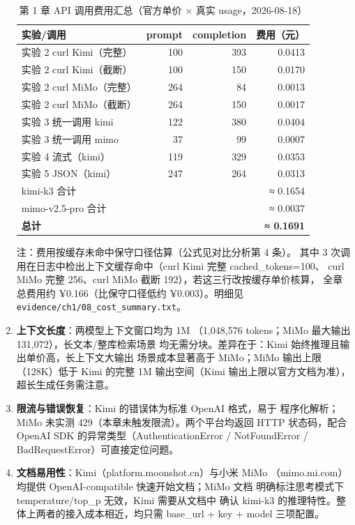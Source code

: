 \begin{enumerate}[leftmargin=4em,itemsep=0pt,topsep=2pt]
\begin{table}[H]
\centering
\caption{第 1 章 API 调用费用汇总（官方单价 × 真实 usage，2026-08-18）}
\label{tab:ch1_cost}
\small
\setlength{\tabcolsep}{4pt}
\begin{tabular}{lrrr}
\toprule
\textbf{实验/调用} & \textbf{prompt} & \textbf{completion} & \textbf{费用（元）} \\
\midrule
实验 2 curl Kimi（完整） & 100 & 393 & 0.0413 \\
实验 2 curl Kimi（截断） & 100 & 150 & 0.0170 \\
实验 2 curl MiMo（完整） & 264 & 84 & 0.0013 \\
实验 2 curl MiMo（截断） & 264 & 150 & 0.0017 \\
实验 3 统一调用 kimi & 122 & 380 & 0.0404 \\
实验 3 统一调用 mimo & 37 & 99 & 0.0007 \\
实验 4 流式（kimi） & 119 & 329 & 0.0353 \\
实验 5 JSON（kimi） & 247 & 264 & 0.0313 \\
\midrule
kimi-k3 合计 & & & ≈ 0.1654 \\
mimo-v2.5-pro 合计 & & & ≈ 0.0037 \\
\textbf{总计} & & & \textbf{≈ 0.1691} \\
\bottomrule
\end{tabular}

\par\vspace{3pt}
\begin{center}
{\footnotesize 注：费用按缓存未命中保守口径估算（公式见对比分析第 4 条）。
其中 3 次调用在日志中检出上下文缓存命中（curl Kimi 完整 cached\_tokens=100、
curl MiMo 完整 256、curl MiMo 截断 192），若这三行改按缓存单价核算，
全章总费用约 ¥0.166（比保守口径低约 ¥0.003）。明细见
\nolinkurl{evidence/ch1/08_cost_summary.txt}。}
\end{center}
\end{table}

    \item \textbf{上下文长度}：两模型上下文窗口均为 1M
          （1,048,576 tokens；MiMo 最大输出 131,072），长文本/整库检索场景
          均无需分块。差异在于：Kimi 始终推理且输出单价高，长上下文大输出
          场景成本显著高于 MiMo；MiMo 输出上限（128K）低于 Kimi 的完整
          1M 输出空间（Kimi 输出上限以官方文档为准），超长生成任务需注意。
    \item \textbf{限流与错误恢复}：Kimi 的错误体为标准 OpenAI 格式，易于
          程序化解析；MiMo 未实测 429（本章未触发限流）。两个平台均返回
          HTTP 状态码，配合 OpenAI SDK 的异常类型（AuthenticationError /
          NotFoundError / BadRequestError）可直接定位问题。
    \item \textbf{文档易用性}：Kimi（platform.moonshot.cn）与小米 MiMo
          （mimo.mi.com）均提供 OpenAI-compatible 快速开始文档；MiMo 文档
          明确标注思考模式下 temperature/top\_p 无效，Kimi 需要从文档中
          确认 kimi-k3 的推理特性。整体上两者的接入成本相近，均只需
          base\_url + key + model 三项配置。
\end{enumerate}

